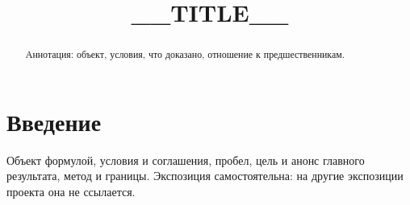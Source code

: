 \documentclass[12pt,a4paper]{article}
\title{__TITLE__}
\author{}
\date{}
\theoremstyle{definition}
\begin{document}
\maketitle
\begin{abstract}
Аннотация: объект, условия, что доказано, отношение к предшественникам.
\end{abstract}

\section{Введение}
Объект формулой, условия и соглашения, пробел, цель и анонс главного результата,
метод и границы. Экспозиция самостоятельна: на другие экспозиции проекта она не ссылается.
\end{document}
